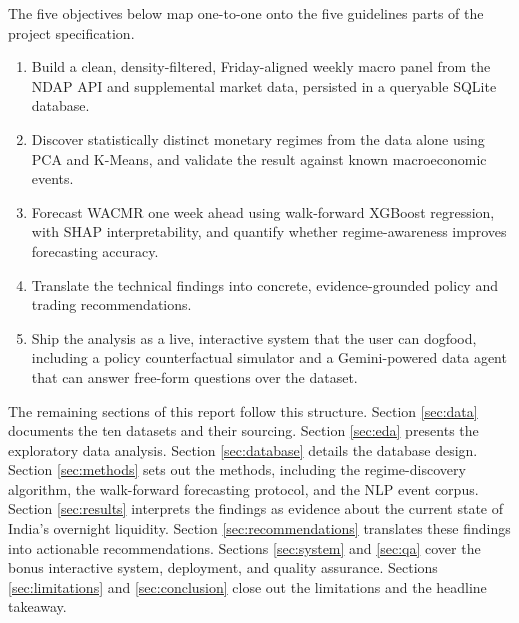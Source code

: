 The five objectives below map one-to-one onto the five guidelines parts
of the project specification.

\begin{enumerate}
\item Build a clean, density-filtered, Friday-aligned weekly macro
  panel from the NDAP API and supplemental market data, persisted in a
  queryable SQLite database.
\item Discover statistically distinct monetary regimes from the data
  alone using PCA and K-Means, and validate the result against known
  macroeconomic events.
\item Forecast WACMR one week ahead using walk-forward XGBoost
  regression, with SHAP interpretability, and quantify whether
  regime-awareness improves forecasting accuracy.
\item Translate the technical findings into concrete, evidence-grounded
  policy and trading recommendations.
\item Ship the analysis as a live, interactive system that the user can
  dogfood, including a policy counterfactual simulator and a
  Gemini-powered data agent that can answer free-form questions over
  the dataset.
\end{enumerate}

The remaining sections of this report follow this structure. Section
\ref{sec:data} documents the ten datasets and their sourcing. Section
\ref{sec:eda} presents the exploratory data analysis. Section
\ref{sec:database} details the database design. Section
\ref{sec:methods} sets out the methods, including the regime-discovery
algorithm, the walk-forward forecasting protocol, and the NLP event
corpus. Section \ref{sec:results} interprets the findings as evidence
about the current state of India's overnight liquidity. Section
\ref{sec:recommendations} translates these findings into actionable
recommendations. Sections \ref{sec:system} and \ref{sec:qa} cover the
bonus interactive system, deployment, and quality assurance. Sections
\ref{sec:limitations} and \ref{sec:conclusion} close out the limitations
and the headline takeaway.
